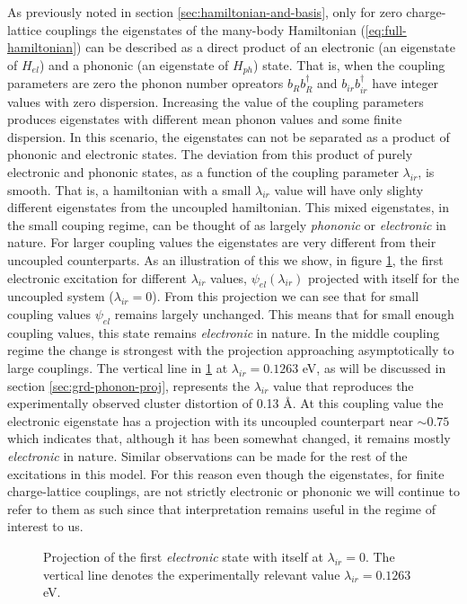 As previously noted in section \ref{sec:hamiltonian-and-basis}, only for zero charge-lattice couplings the eigenstates of the many-body Hamiltonian (\ref{eq:full-hamiltonian}) can be described as a direct product of an electronic (an eigenstate of $H_{el}$) and a phononic (an eigenstate of $H_{ph}$) state.
That is, when the coupling parameters are zero the phonon number opreators $b_Rb^\dagger_R$ and $b_{ir}b^\dagger_{ir}$ have integer values with zero dispersion.
Increasing the value of the coupling parameters produces eigenstates with different mean phonon values and some finite dispersion.
In this scenario, the eigenstates can not be separated as a product of phononic and electronic states.
The deviation from this product of purely electronic and phononic states, as a function of the coupling parameter $\lambda_{ir}$, is smooth.
That is, a hamiltonian with a small $\lambda_{ir}$ value will have only slighty different eigenstates from the uncoupled hamiltonian.
This mixed eigenstates, in the small couping regime, can be thought of as largely \textit{phononic} or \textit{electronic} in nature.
For larger coupling values the eigenstates are very different from their uncoupled counterparts.
As an illustration of this we show, in figure \ref{fig:electr-proj}, the first electronic excitation for different $\lambda_{ir}$ values, $\psi_{el}(\lambda_{ir})$ projected with itself for the uncoupled system ($\lambda_{ir}=0$).
From this projection we can see that for small coupling values $\psi_{el}$ remains largely unchanged.
This means that for small enough coupling values, this state remains \textit{electronic} in nature.
In the middle coupling regime the change is strongest with the projection approaching asymptotically to large couplings.
The vertical line in \ref{fig:electr-proj} at $\lambda_{ir}=0.1263$ eV, as will be discussed in section \ref{sec:grd-phonon-proj}, represents the $\lambda_{ir}$ value that reproduces the experimentally observed cluster distortion of 0.13 \AA.
At this coupling value the electronic eigenstate has a projection with its uncoupled counterpart near $\sim 0.75$ which indicates that, although it has been somewhat changed, it remains mostly \textit{electronic} in nature.
Similar observations can be made for the rest of the excitations in this model.
For this reason even though the eigenstates, for finite charge-lattice couplings, are not strictly electronic or phononic we will continue to refer to them as such since that interpretation remains useful in the regime of interest to us.
%
\begin{figure}[ht]
  \centering
  
  \caption[Projection of the first \textit{electronic} state with itself at $\lambda_{ir}=0$.]
  {Projection of the first \textit{electronic} state with itself at $\lambda_{ir}=0$.
    The vertical line denotes the experimentally relevant value $\lambda_{ir}=0.1263$ eV.}
  \label{fig:electr-proj}
\end{figure}

